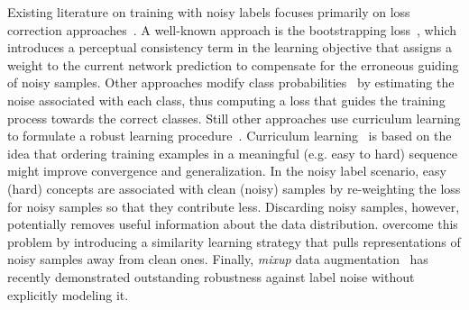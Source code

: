 \documentclass{article}
\begin{document}
Existing literature on training with noisy labels focuses primarily
on loss correction approaches~\cite{2015_ICLR_Bootstrapping,2018_NIPS_GoldLoss,2018_ICML_MentorNet}.
A well-known approach is the bootstrapping loss~\cite{2015_ICLR_Bootstrapping},
which introduces a perceptual consistency term in the learning objective
that assigns a weight to the current network prediction to compensate
for the erroneous guiding of noisy samples. Other approaches modify
class probabilities~\cite{2017_CVPR_ForwardLoss,2018_NIPS_GoldLoss}
by estimating the noise associated with each class, thus computing
a loss that guides the training process towards the correct classes.
Still other approaches use curriculum learning to formulate a robust
learning procedure~\cite{2018_ICML_MentorNet,2018_ICML_L2ReweightNoise}.
Curriculum learning~\cite{2009_ICML_CurrLearn} is based on the idea
that ordering training examples in a meaningful (e.g. easy to hard)
sequence might improve convergence and generalization. In the noisy
label scenario, easy (hard) concepts are associated with clean (noisy)
samples by re-weighting the loss for noisy samples so that they contribute
less. Discarding noisy samples, however, potentially removes useful
information about the data distribution. \cite{2018_CVPR_IterativeNoise}
overcome this problem by introducing a similarity learning strategy
that pulls representations of noisy samples away from clean ones. Finally,
\emph{mixup} data augmentation~\cite{2018_ICLR_mixup} has recently
demonstrated outstanding robustness against label noise without explicitly
modeling it.
\end{document}
